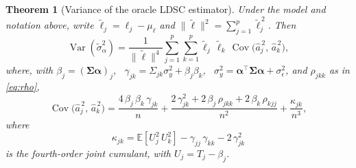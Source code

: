 \documentclass[11pt]{article}
\newcommand{\Cov}{\operatorname{Cov}}
\newcommand{\Var}{\operatorname{Var}}
\newcommand{\E}{\mathbb{E}}
\newcommand{\bSig}{\boldsymbol{\Sigma}}
\newcommand{\balpha}{\boldsymbol{\alpha}}
\theoremstyle{plain}
\newtheorem{theorem}{Theorem}
\theoremstyle{definition}
\theoremstyle{remark}
\begin{document}
\begin{theorem}[Variance of the oracle LDSC estimator]\label{thm:main}
Under the model and notation above, write
$\widetilde\ell_j = \ell_j - \mu_\ell$ and
$\|\widetilde{\boldsymbol{\ell}}\|^2
= \sum_{j=1}^p \widetilde\ell_j^{\,2}$.
Then
\begin{equation}\label{eq:var_exact}
\boxed{
    \Var(\widetilde\sigma_\alpha^2)
    = \frac{1}{\|\widetilde{\boldsymbol{\ell}}\|^4}
      \sum_{j=1}^{p}\sum_{k=1}^{p}
      \widetilde\ell_j\,\widetilde\ell_k\,
      \Cov\!\bigl(\widehat{a}_j^{\,2},\,\widehat{a}_k^{\,2}\bigr),
}
\end{equation}
where, with $\beta_j=(\bSig\balpha)_j$, \ 
$\gamma_{jk}=\Sigma_{jk}\sigma_y^2+\beta_j\beta_k$, \ 
$\sigma_y^2 = \balpha^\top\bSig\balpha+\sigma_\epsilon^2$, and
$\rho_{jkk}$ as in \eqref{eq:rho},
\begin{equation}\label{eq:cov_ajak}
    \Cov\!\bigl(\widehat{a}_j^{\,2},\,\widehat{a}_k^{\,2}\bigr)
    = \frac{4\,\beta_j\,\beta_k\,\gamma_{jk}}{n}
    + \frac{2\,\gamma_{jk}^2
            + 2\,\beta_j\,\rho_{jkk}
            + 2\,\beta_k\,\rho_{kjj}}{n^2}
    + \frac{\kappa_{jk}}{n^3},
\end{equation}
where
\begin{equation}\label{eq:kappa}
    \kappa_{jk}
    = \E[U_j^2\,U_k^2] - \gamma_{jj}\,\gamma_{kk} - 2\,\gamma_{jk}^2
\end{equation}
is the fourth-order joint cumulant, with $U_j = T_j - \beta_j$.
\end{theorem}
\end{document}
